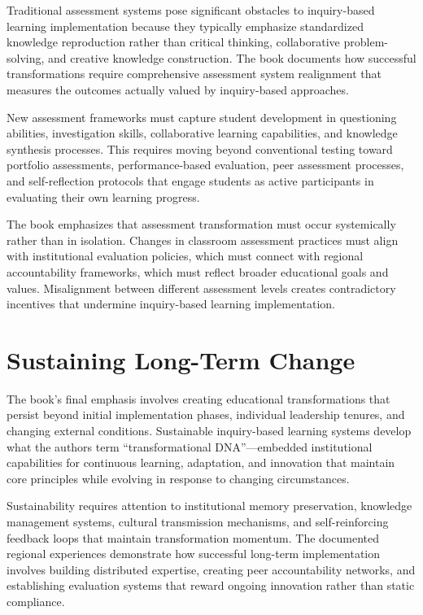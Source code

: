 \documentclass[
  Letterpaper,
]{scrbook}
\begin{document}
Traditional assessment systems pose significant obstacles to
inquiry-based learning implementation because they typically emphasize
standardized knowledge reproduction rather than critical thinking,
collaborative problem-solving, and creative knowledge construction. The
book documents how successful transformations require comprehensive
assessment system realignment that measures the outcomes actually valued
by inquiry-based approaches.

New assessment frameworks must capture student development in
questioning abilities, investigation skills, collaborative learning
capabilities, and knowledge synthesis processes. This requires moving
beyond conventional testing toward portfolio assessments,
performance-based evaluation, peer assessment processes, and
self-reflection protocols that engage students as active participants in
evaluating their own learning progress.

The book emphasizes that assessment transformation must occur
systemically rather than in isolation. Changes in classroom assessment
practices must align with institutional evaluation policies, which must
connect with regional accountability frameworks, which must reflect
broader educational goals and values. Misalignment between different
assessment levels creates contradictory incentives that undermine
inquiry-based learning implementation.

\section{Sustaining Long-Term Change}\label{sustaining-long-term-change}

The book's final emphasis involves creating educational transformations
that persist beyond initial implementation phases, individual leadership
tenures, and changing external conditions. Sustainable inquiry-based
learning systems develop what the authors term ``transformational
DNA''---embedded institutional capabilities for continuous learning,
adaptation, and innovation that maintain core principles while evolving
in response to changing circumstances.

Sustainability requires attention to institutional memory preservation,
knowledge management systems, cultural transmission mechanisms, and
self-reinforcing feedback loops that maintain transformation momentum.
The documented regional experiences demonstrate how successful long-term
implementation involves building distributed expertise, creating peer
accountability networks, and establishing evaluation systems that reward
ongoing innovation rather than static compliance.
\end{document}
